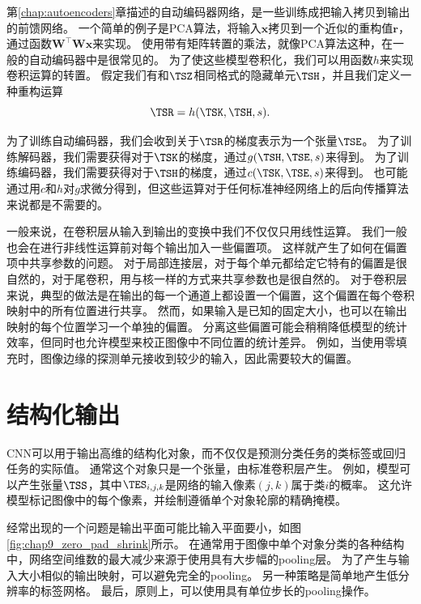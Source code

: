 第\ref{chap:autoencoders}章描述的自动编码器网络，是一些训练成把输入拷贝到输出的前馈网络。
一个简单的例子是PCA算法，将输入$\bm{x}$拷贝到一个近似的重构值$\bm{r}$，通过函数$\bm{W}^\top \bm{Wx}$来实现。
使用带有矩阵转置的乘法，就像PCA算法这种，在一般的自动编码器中是很常见的。
为了使这些模型卷积化，我们可以用函数$h$来实现卷积运算的转置。
假定我们有和$\TSZ$相同格式的隐藏单元$\TSH$，并且我们定义一种重构运算
\begin{equation}
\TSR = h(\TSK, \TSH, s).
\end{equation}

为了训练自动编码器，我们会收到关于$\TSR$的梯度表示为一个张量$\TSE$。
为了训练解码器，我们需要获得对于$\TSK$的梯度，通过$g(\TSH, \TSE, s)$来得到。
为了训练编码器，我们需要获得对于$\TSH$的梯度，通过$c(\TSK, \TSE, s)$来得到。
也可能通过用$c$和$h$对$g$求微分得到，但这些运算对于任何标准神经网络上的后向传播算法来说都是不需要的。
 
 
一般来说，在卷积层从输入到输出的变换中我们不仅仅只用线性运算。
我们一般也会在进行非线性运算前对每个输出加入一些偏置项。
这样就产生了如何在偏置项中共享参数的问题。
对于局部连接层，对于每个单元都给定它特有的偏置是很自然的，对于尾卷积，用与核一样的方式来共享参数也是很自然的。
对于卷积层来说，典型的做法是在输出的每一个通道上都设置一个偏置，这个偏置在每个卷积映射中的所有位置进行共享。
然而，如果输入是已知的固定大小，也可以在输出映射的每个位置学习一个单独的偏置。
分离这些偏置可能会稍稍降低模型的统计效率，但同时也允许模型来校正图像中不同位置的统计差异。
例如，当使用零填充时，图像边缘的探测单元接收到较少的输入，因此需要较大的偏置。

\section{结构化输出}
\label{sec:structured_outputs}

\gls{CNN}可以用于输出高维的结构化对象，而不仅仅是预测分类任务的类标签或回归任务的实际值。
通常这个对象只是一个张量，由标准卷积层产生。
例如，模型可以产生张量$\TSS$，其中$\TES_{i,j,k}$是网络的输入像素$(j, k)$属于类$i$的概率。
这允许模型标记图像中的每个像素，并绘制遵循单个对象轮廓的精确掩模。

经常出现的一个问题是输出平面可能比输入平面要小，如图\ref{fig:chap9_zero_pad_shrink}所示。
在通常用于图像中单个对象分类的各种结构中，网络空间维数的最大减少来源于使用具有大步幅的\gls{pooling}层。
为了产生与输入大小相似的输出映射，可以避免完全的\gls{pooling}\citep{jain2007supervised}。
另一种策略是简单地产生低分辨率的标签网格\citep{Pinheiro+Collobert-ICML2014,Pinheiro+Collobert-CVPR2015}。
最后，原则上，可以使用具有单位步长的\gls{pooling}操作。


